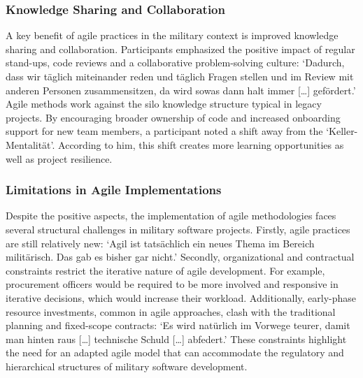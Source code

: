 \subsubsection{Knowledge Sharing and Collaboration}
A key benefit of agile practices in the military context is improved knowledge sharing and collaboration. Participants emphasized the positive impact of regular stand-ups, code reviews and a collaborative problem-solving culture: `Dadurch, dass wir täglich miteinander reden und täglich Fragen stellen und im Review mit anderen 
Personen zusammensitzen, da wird sowas dann halt immer [\ldots] gefördert.' Agile methods work against the silo knowledge structure typical in legacy projects. By encouraging broader ownership of code and increased onboarding support for new team members, a participant noted a shift away from the `Keller-Mentalität'. According to him,
this shift creates more learning opportunities as well as project resilience.\\

\subsubsection{Limitations in Agile Implementations}
Despite the positive aspects, the implementation of agile methodologies faces several structural challenges in military software projects. Firstly, agile practices are still relatively new: `Agil ist tatsächlich ein neues Thema im Bereich militärisch. Das gab es bisher gar nicht.'
Secondly, organizational and contractual constraints restrict the iterative nature of agile development. For example, procurement officers would be required to be more involved and responsive in iterative decisions, which would increase their workload. Additionally, early-phase resource investments, common in agile approaches,
clash with the traditional planning and fixed-scope contracts: `Es wird natürlich im Vorwege teurer, damit man hinten raus [\ldots] technische Schuld [\ldots] abfedert.' These constraints highlight the need for an adapted agile model that can accommodate the regulatory and hierarchical structures of military software development.\\

